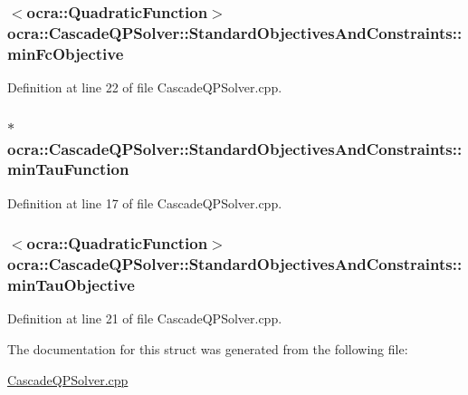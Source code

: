 \subsubsection[{\texorpdfstring{min\+Fc\+Objective}{minFcObjective}}]{$<${\bf ocra\+::\+Quadratic\+Function}$>$ ocra\+::\+Cascade\+Q\+P\+Solver\+::\+Standard\+Objectives\+And\+Constraints\+::min\+Fc\+Objective}\hypertarget{structocra_1_1CascadeQPSolver_1_1StandardObjectivesAndConstraints_a81fe424070d5b919b083044a4ea7a473}{}\label{structocra_1_1CascadeQPSolver_1_1StandardObjectivesAndConstraints_a81fe424070d5b919b083044a4ea7a473}


Definition at line 22 of file Cascade\+Q\+P\+Solver.\+cpp.

\subsubsection[{\texorpdfstring{min\+Tau\+Function}{minTauFunction}}]{$\ast$ ocra\+::\+Cascade\+Q\+P\+Solver\+::\+Standard\+Objectives\+And\+Constraints\+::min\+Tau\+Function}\hypertarget{structocra_1_1CascadeQPSolver_1_1StandardObjectivesAndConstraints_a1268aaa4e0f1eb462eb04d6634f1b110}{}\label{structocra_1_1CascadeQPSolver_1_1StandardObjectivesAndConstraints_a1268aaa4e0f1eb462eb04d6634f1b110}


Definition at line 17 of file Cascade\+Q\+P\+Solver.\+cpp.

\subsubsection[{\texorpdfstring{min\+Tau\+Objective}{minTauObjective}}]{$<${\bf ocra\+::\+Quadratic\+Function}$>$ ocra\+::\+Cascade\+Q\+P\+Solver\+::\+Standard\+Objectives\+And\+Constraints\+::min\+Tau\+Objective}\hypertarget{structocra_1_1CascadeQPSolver_1_1StandardObjectivesAndConstraints_a3abba9256a6fbbd58d1f8f54ce63da4e}{}\label{structocra_1_1CascadeQPSolver_1_1StandardObjectivesAndConstraints_a3abba9256a6fbbd58d1f8f54ce63da4e}


Definition at line 21 of file Cascade\+Q\+P\+Solver.\+cpp.



The documentation for this struct was generated from the following file\+:\begin{DoxyCompactItemize}
\item 
\hyperlink{CascadeQPSolver_8cpp}{Cascade\+Q\+P\+Solver.\+cpp}\end{DoxyCompactItemize}
